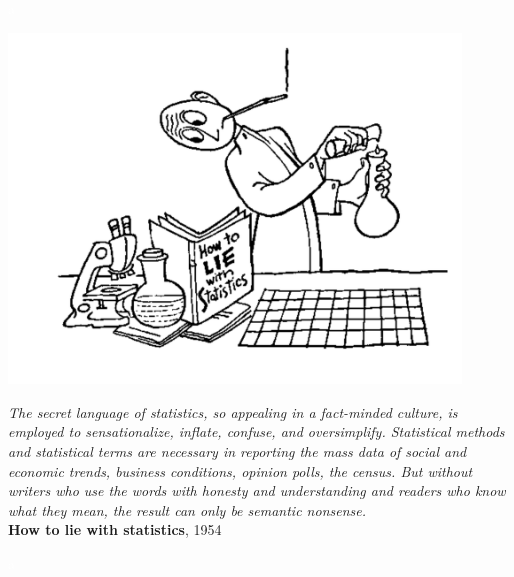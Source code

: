 \documentclass[12pt,spanish,a4paper]{article}
\numberwithin{equation}{section}
\begin{document}

\newpage
\pagestyle{empty}
\pagecolor{white}
\textcolor{white}{a}


\newpage
\pagestyle{empty}
\pagecolor{white}
\vspace*{4cm}
\begin{center}
\includegraphics[width=120mm]{figures/howtoliewithstatistics}
\end{center}

\begin{flushright}
{\scriptsize {\it The secret language of statistics, so appealing in a fact-minded culture, is employed to sensationalize, inflate, confuse, and oversimplify. Statistical methods and statistical terms are necessary in reporting the mass data of social and economic trends, business conditions, opinion polls, the census. But without writers who use the words with honesty and understanding and readers who know what they mean, the result can only be semantic nonsense. }\\}
{\scriptsize {\bf How to lie with statistics}, 1954}
\end{flushright}


\newpage
\pagestyle{empty}
\pagecolor{white}
\textcolor{white}{a}

\end{document}
